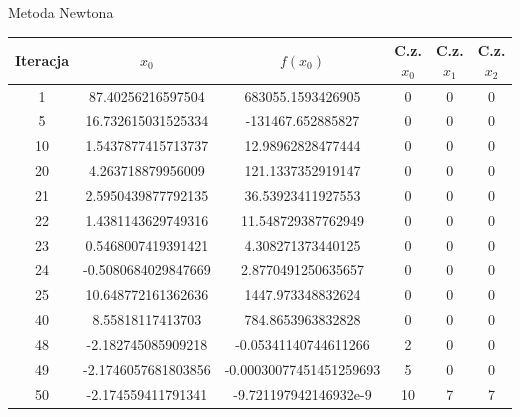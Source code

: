 \documentclass[a4paper]{article}
\begin{document}
    \begin{center}
        Metoda Newtona
    \end{center}
    \begin{center}
        \begin{tabular}{|c|c|c|c|c|c|} 
            \hline
            Iteracja & $x_0$ & $f(x_0)$ & C.z. $x_0$ & C.z. $x_1$ & C.z. $x_2$ \\
            \hline
            1 & 87.40256216597504 & 683055.1593426905 & 0 & 0 & 0 \\
            \hline
            5 & 16.732615031525334 & -131467.652885827 & 0 & 0 & 0 \\
            \hline
            10 & 1.5437877415713737 & 12.98962828477444 & 0 & 0 & 0 \\
            \hline
            20 & 4.263718879956009 & 121.1337352919147 & 0 & 0 & 0 \\
            \hline
            21 & 2.5950439877792135 & 36.53923411927553 & 0 & 0 & 0 \\
            \hline
            22 & 1.4381143629749316 & 11.548729387762949 & 0 & 0 & 0 \\
            \hline
            23 & 0.5468007419391421 & 4.308271373440125 & 0 & 0 & 0 \\
            \hline
            24 & -0.5080684029847669 & 2.8770491250635657 & 0 & 0 & 0 \\
            \hline
            25 & 10.648772161362636 & 1447.973348832624 & 0 & 0 & 0 \\
            \hline
            40 & 8.55818117413703 & 784.8653963832828 & 0 & 0 & 0 \\
            \hline
            48 & -2.182745085909218 & -0.05341140744611266 & 2 & 0 & 0 \\
            \hline
            49 & -2.1746057681803856 & -0.00030077451451259693 & 5 & 0 & 0 \\
            \hline
            50 & -2.174559411791341 & -9.721197942146932e-9 & 10 & 7 & 7 \\
            \hline

        \end{tabular}
    \end{center}
        
    \vspace{5mm}
\end{document}
